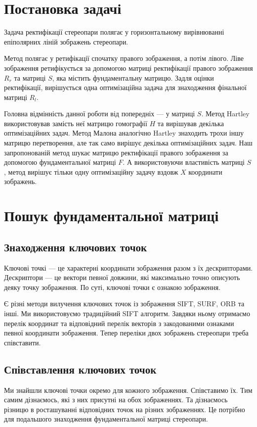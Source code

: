 \section{Постановка задачі}
Задача ректифікації стереопари полягає у горизонтальному вирівнюванні 
епіполярних ліній зображень стереопари. 

Метод полягає у ретифікації спочатку правого зображення, а потім лівого. Ліве 
зображення ретифікується за допомогою матриці ректифікації правого зображення 
$R_r$ та матриці $S$, яка містить фундаментальну матрицю. Задля оцінки 
ректифікації, вирішується одна оптимізаційна задача для знаходження фінальної 
матриці $R_l$.

Головна відмінність данної роботи від попередніх --- у матриці $S$. Метод 
Hartley\cite{DBLP:journals/ijcv/Hartley99} використовував замість неї матрицю 
гомографії $H$ та вирішував декілька оптимізаційних задач. Метод 
Малона\cite{Mallon2005ProjectiveRF} аналогічно Hartley знаходить трохи іншу 
матрицю перетворення, але так само вирішує декілька оптимізаційних задач. Наш 
запропонованій метод шукає матрицю ректифікації правого зображення за допомогою 
фундаментальної матриці $F$. А використовуючи властивість матриці $S$, метод 
вирішує тільки одну оптимізаційну задачу вздовж $X$ координати зображень.



\section{Пошук фундаментальної матриці}
\subsection{Знаходження ключових точок}
Ключові точкі --- це характерні координати зображення разом з їх дескрипторами.
Дескриптори --- це вектори певної довжини, які максимально точно описують деяку 
точку зображення. По суті, ключові точки є ознакою зображення.

Є різні методи вилучення ключових точок із зображення 
SIFT\cite{10.1023/B:VISI.0000029664.99615.94}, SURF\cite{Bay2006SURFSU}, 
ORB\cite{6126544} та інші. Ми використовуємо традиційний SIFT алгоритм. 
Завдяки ньому отримаємо перелік координат та відповідний перелік векторів з 
закодованими ознаками певної координати зображення. Тепер переліки двох 
зображень стереопари треба співставити.


\subsection{Співставлення ключових точок}
Ми знайшли ключові точки окремо для кожного зображення. Співставимо їх. Тим самим
дізнаємось, які з них присутні на обох зображеннях. Та дізнаємось різницю в 
росташуванні відповідних точок на різних зображеннях. Це потрібно для подальшого 
знаходження фундаментальної матриці стереопари.

